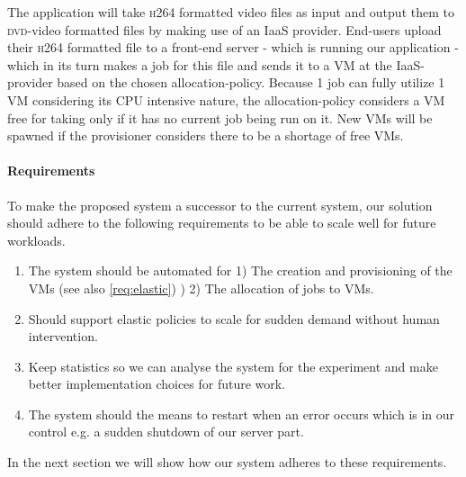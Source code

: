 The application will take \textsc{h264} formatted video files as input
and output them to \textsc{dvd}-video formatted files by making use of
an IaaS provider. End-users upload their \textsc{h264} formatted file
to a front-end server - which is running our application - which in
its turn makes a job for this file and sends it to a VM at the
IaaS-provider based on the chosen allocation-policy. Because 1 job can
fully utilize 1 VM considering its \textsc{CPU} intensive nature, the
allocation-policy considers a VM free for taking only if it has
no current job being run on it. New VMs will be spawned if the
provisioner considers there to be a shortage of free VMs. 

\paragraph{Requirements}
To make the proposed system a successor to the current system, our
solution should adhere to the following requirements to be able to
scale well for future workloads.

\begin{enumerate}[i]
\item The system should be automated for 1) The creation and
  provisioning of the VMs (see also \ref{req:elastic}) ) 2) The
  allocation of jobs to VMs.
\item \label{req:elastic}Should support elastic policies to scale for
  sudden demand without human intervention.
\item Keep statistics so we can analyse the system for the experiment
  and make better implementation choices for future work.
\item The system should the means to restart when an error occurs
  which is in our control e.g. a sudden shutdown of our server part.
\end{enumerate}
In the next section we will show how our system adheres to these
requirements.
